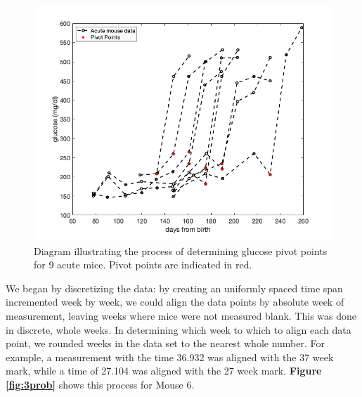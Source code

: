 \begin{figure}[H]
    \centering
    \includegraphics[width=15cm]{Model_Setup_Images/acute_pivotPoints.png}
    \caption{Diagram illustrating the process of determining glucose pivot points for 9 acute mice. Pivot points are indicated in red.}
    \label{fig:2prob}
\end{figure}
\par We began by discretizing the data: by creating an uniformly spaced time span incremented week by week, we could align the data points by absolute week of measurement, leaving weeks where mice were not measured blank. This was done in discrete, whole weeks. In determining which week to which to align each data point, we rounded weeks in the data set to the nearest whole number. For example, a measurement with the time 36.932 was aligned with the 37 week mark, while a time of 27.104 was aligned with the 27 week mark. \textbf{Figure \ref{fig:3prob}} shows this process for Mouse 6.
